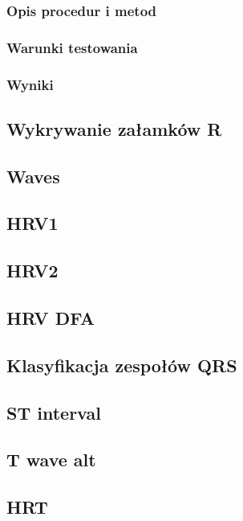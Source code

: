 \documentclass[a4paper, 11pt]{article}
\begin{document}
\subsubsection{Opis procedur i metod}

\subsubsection{Warunki testowania}

\subsubsection{Wyniki}

\subsection{Wykrywanie załamków R}

\subsection{Waves}

\subsection{HRV1}

\subsection{HRV2}

\subsection{HRV DFA}

\subsection{Klasyfikacja zespołów QRS}

\subsection{ST interval}

\subsection{T wave alt}

\subsection{HRT}
\end{document}
